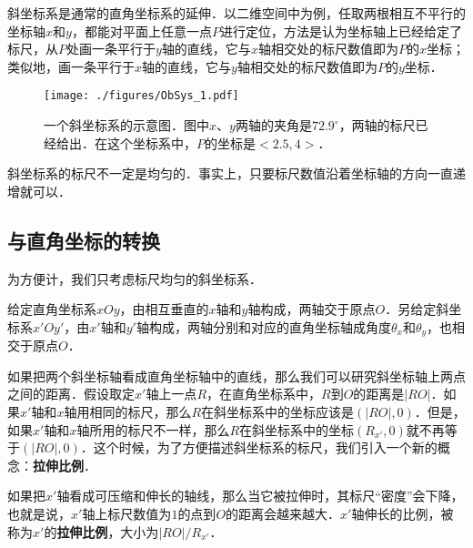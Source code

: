 

斜坐标系是通常的直角坐标系的延伸．以二维空间中为例，任取两根相互不平行的坐标轴$x$和$y$，都能对平面上任意一点$P$进行定位，方法是认为坐标轴上已经给定了标尺，从$P$处画一条平行于$y$轴的直线，它与$x$轴相交处的标尺数值即为$P$的$x$坐标；类似地，画一条平行于$x$轴的直线，它与$y$轴相交处的标尺数值即为$P$的$y$坐标．

\begin{figure}[ht]
\centering
\texttt{[image: ./figures/ObSys\_1.pdf]}
\caption{一个斜坐标系的示意图．图中$x$、$y$两轴的夹角是$72.9^\circ$，两轴的标尺已经给出．在这个坐标系中，$P$的坐标是$<2.5, 4>$．} \label{ObSys_fig1}
\end{figure}

斜坐标系的标尺不一定是均匀的．事实上，只要标尺数值沿着坐标轴的方向一直递增就可以．

\subsection{与直角坐标的转换}

为方便计，我们只考虑标尺均匀的斜坐标系．

给定直角坐标系$xOy$，由相互垂直的$x$轴和$y$轴构成，两轴交于原点$O$．另给定斜坐标系$x'Oy'$，由$x'$轴和$y'$轴构成，两轴分别和对应的直角坐标轴成角度$\theta_x$和$\theta_y$，也相交于原点$O$．

如果把两个斜坐标轴看成直角坐标轴中的直线，那么我们可以研究斜坐标轴上两点之间的距离．假设取定$x'$轴上一点$R$，在直角坐标系中，$R$到$O$的距离是$|RO|$．如果$x'$轴和$x$轴用相同的标尺，那么$R$在斜坐标系中的坐标应该是$(|RO|, 0)$．但是，如果$x'$轴和$x$轴所用的标尺不一样，那么$R$在斜坐标系中的坐标$(R_{x'},0)$就不再等于$(|RO|, 0)$．这个时候，为了方便描述斜坐标系的标尺，我们引入一个新的概念：\textbf{拉伸比例}．

如果把$x'$轴看成可压缩和伸长的轴线，那么当它被拉伸时，其标尺“密度”会下降，也就是说，$x'$轴上标尺数值为$1$的点到$O$的距离会越来越大．$x'$轴伸长的比例，被称为$x'$的\textbf{拉伸比例}，大小为$|RO|/R_{x'}$．


